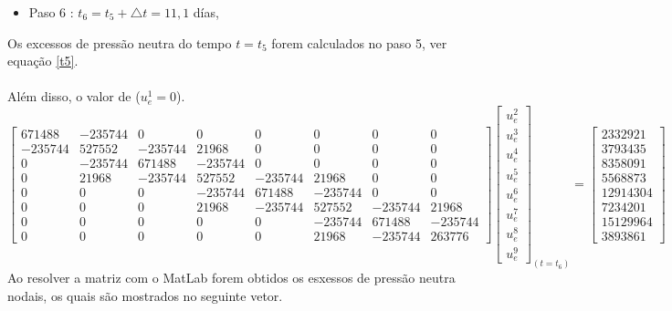\documentclass{article} %
\begin{document}
\begin{itemize}
	\item Paso 6 : \(t_6=t_5+\triangle t=11,1\) días,
\end{itemize}

Os excessos de pressão neutra do tempo \(t=t_5\) forem calculados no paso 5, ver equação \ref{t5}.\\
\\
\indent Além disso, o valor de (\(u_e^1=0\)).\\

\begin{equation*}
\begin{bmatrix}
671488& -235744& 0& 0& 0& 0& 0& 0\\
-235744&527552&-235744&21968& 0& 0& 0& 0\\
0&-235744&671488&-235744& 0& 0& 0& 0\\
0&21968&-235744&527552&-235744&21968& 0& 0\\
0&0&0& -235744&671488&-235744& 0& 0\\
0&0&0&21968&-235744&527552&-235744&21968\\
0&0&0&0&0&-235744&671488&-235744\\
0&0&0&0&0&21968&-235744&263776
\end{bmatrix}\begin{bmatrix}
u_e^2\\
u_e^3\\
u_e^4\\
u_e^5\\
u_e^6\\
u_e^7\\
u_e^8\\
u_e^9
\end{bmatrix}_{(t=t_6)}
=\begin{bmatrix}
2332921\\
3793435\\
8358091\\
5568873\\
12914304\\
7234201\\
15129964\\
3893861
\end{bmatrix}
\end{equation*}
\indent Ao resolver a matriz com o MatLab forem obtidos os esxessos de pressão neutra nodais, os quais são mostrados no seguinte vetor.
\end{document}
